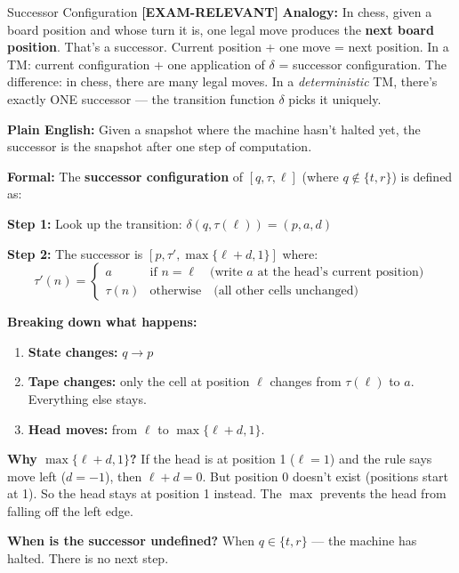 \documentclass[11pt,a4paper]{article}
\newcommand{\kemark}{\textcolor{red!70!black}{\textbf{[EXAM-RELEVANT]}}}
\begin{document}
\begin{definitionbox}{Successor Configuration \kemark}
\textbf{Analogy:} In chess, given a board position and whose turn it is, one legal move produces the \textbf{next board position}. That's a successor. Current position + one move = next position. In a TM: current configuration + one application of $\delta$ = successor configuration. The difference: in chess, there are many legal moves. In a \textit{deterministic} TM, there's exactly ONE successor --- the transition function $\delta$ picks it uniquely.

\textbf{Plain English:} Given a snapshot where the machine hasn't halted yet, the successor is the snapshot after one step of computation.

\textbf{Formal:} The \textbf{successor configuration} of $[q, \tau, \ell]$ (where $q \notin \{t, r\}$) is defined as:

\textbf{Step 1:} Look up the transition: $\delta(q, \tau(\ell)) = (p, a, d)$

\textbf{Step 2:} The successor is $[p, \tau', \max\{\ell + d, 1\}]$ where:
$$\tau'(n) = \begin{cases} a & \text{if } n = \ell \quad \text{(write $a$ at the head's current position)} \\ \tau(n) & \text{otherwise} \quad \text{(all other cells unchanged)} \end{cases}$$

\textbf{Breaking down what happens:}
\begin{enumerate}[nosep]
\item \textbf{State changes:} $q \to p$
\item \textbf{Tape changes:} only the cell at position $\ell$ changes from $\tau(\ell)$ to $a$. Everything else stays.
\item \textbf{Head moves:} from $\ell$ to $\max\{\ell + d, 1\}$.
\end{enumerate}

\textbf{Why $\max\{\ell + d, 1\}$?} If the head is at position 1 ($\ell = 1$) and the rule says move left ($d = -1$), then $\ell + d = 0$. But position 0 doesn't exist (positions start at 1). So the head stays at position 1 instead. The $\max$ prevents the head from falling off the left edge.

\textbf{When is the successor undefined?} When $q \in \{t, r\}$ --- the machine has halted. There is no next step.
\end{definitionbox}
\end{document}
